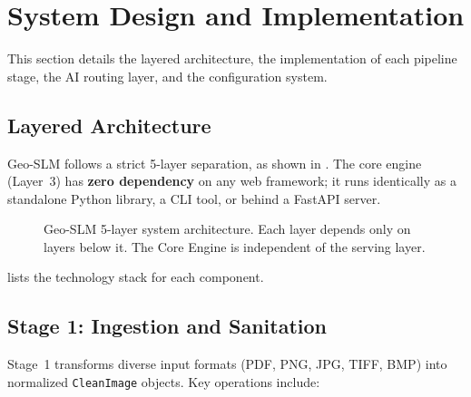 \section{System Design and Implementation}

This section details the layered architecture, the implementation of each pipeline stage,
the AI routing layer, and the configuration system.

\subsection{Layered Architecture}

Geo-SLM follows a strict 5-layer separation, as shown in . The
core engine (Layer~3) has \textbf{zero dependency} on any web framework; it runs
identically as a standalone Python library, a CLI tool, or behind a FastAPI server.

\begin{figure}[htbp]
\centering

\caption{Geo-SLM 5-layer system architecture. Each layer depends only on layers below it.
    The Core Engine is independent of the serving layer.}
\label{fig:layer_arch}
\end{figure}

 lists the technology stack for each component.

\begin{table}[htbp]
\centering
\caption{Technology stack overview.}
\label{tab:tech}

\end{table}

\subsection{Stage 1: Ingestion and Sanitation}

Stage~1 transforms diverse input formats (PDF, PNG, JPG, TIFF, BMP) into normalized
\texttt{CleanImage} objects. Key operations include:

